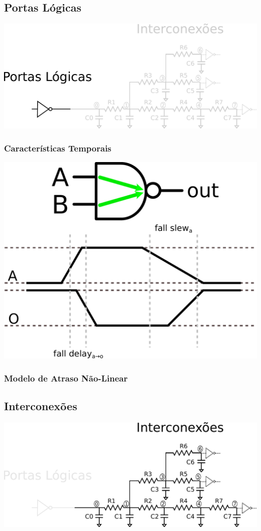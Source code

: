 \documentclass[10pt,a4paper]{beamer}
\begin{document}
		\subsection*{Portas Lógicas}
			\begin{frame}
				\includegraphics[width=\textwidth]{img/circuito_portas.pdf} 
			\end{frame}
			
			\begin{frame}
				\frametitle{Características Temporais}
				\includegraphics[width=0.8 \textwidth]{img/caracteristicas_temporais_portas_logicas.pdf} 
			\end{frame}
			
			\begin{frame}
				\frametitle{Modelo de Atraso Não-Linear}
			\end{frame}
		
		\subsection*{Interconexões}

			
			\begin{frame}
				\includegraphics[width=\textwidth]{img/circuito_interconexao.pdf} 
			\end{frame}
			
\end{document}
